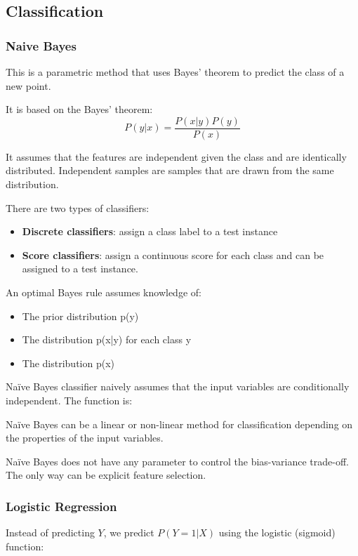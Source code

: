 \subsection*{Classification}

\subsubsection*{Naive Bayes}
This is a parametric method that uses Bayes' theorem to predict the class of a new point.

It is based on the Bayes' theorem:
$$P(y|x) = \frac{P(x|y)P(y)}{P(x)}$$

It assumes that the features are independent given the class and are identically distributed.
Independent samples are samples that are drawn from the same distribution.

There are two types of classifiers:
\begin{itemize}[noitemsep]
    \item \textbf{Discrete classifiers}: assign a class label to a test instance
    \item \textbf{Score classifiers}: assign a continuous score for each class and can be assigned to a test instance.
\end{itemize}

An optimal Bayes rule assumes knowledge of:
\begin{itemize}[noitemsep]
    \item The prior distribution p(y)
    \item The distribution p(x|y) for each class y
    \item The distribution p(x)
\end{itemize}

Naïve Bayes classifier naively assumes that the input variables are conditionally independent. The function is:

Naïve Bayes can be a linear or non-linear method for classification depending on the properties of the input variables.

Naïve Bayes does not have any parameter to control the bias-variance trade-off. The only way can be explicit feature selection.

\subsubsection*{Logistic Regression}
Instead of predicting $Y$, we predict $P(Y=1|X)$ using the logistic (sigmoid) function:

